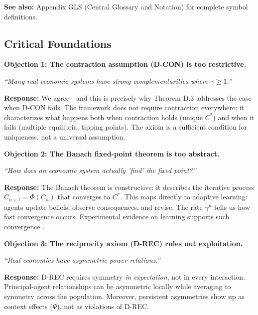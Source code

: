 \textbf{See also:} Appendix GLS (Central Glossary and Notation) for complete symbol definitions.


\subsection{Critical Foundations}
\label{sec:D-foundations}

\begin{tcolorbox}[colback=red!5!white, colframe=red!75!black,
    title=\textbf{Critical Foundations: Objections and Responses}]

\textbf{Objection 1: The contraction assumption (D-CON) is too restrictive.}

\textit{``Many real economic systems have strong complementarities where $\gamma \geq 1$.''}

\textbf{Response:} We agree---and this is precisely why Theorem D.3 addresses the
case when D-CON fails. The framework does not require contraction everywhere;
it characterizes what happens both when contraction holds (unique $C^*$) and
when it fails (multiple equilibria, tipping points). The axiom is a sufficient
condition for uniqueness, not a universal assumption.

\medskip

\textbf{Objection 2: The Banach fixed-point theorem is too abstract.}

\textit{``How does an economic system actually 'find' the fixed point?''}

\textbf{Response:} The Banach theorem is constructive: it describes the iterative
process $C_{n+1} = \Phi(C_n)$ that converges to $C^*$. This maps directly to
adaptive learning: agents update beliefs, observe consequences, and revise.
The rate $\gamma^n$ tells us how fast convergence occurs. Experimental evidence
on learning supports such convergence \citep{camerer2003}.

\medskip

\textbf{Objection 3: The reciprocity axiom (D-REC) rules out exploitation.}

\textit{``Real economies have asymmetric power relations.''}

\textbf{Response:} D-REC requires symmetry \emph{in expectation}, not in every
interaction. Principal-agent relationships can be asymmetric locally while
averaging to symmetry across the population. Moreover, persistent asymmetries
show up as context effects ($\Psi$), not as violations of D-REC.


\end{tcolorbox}
